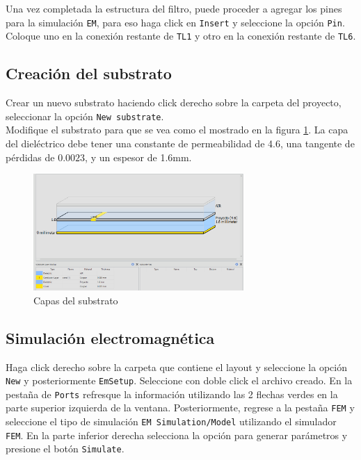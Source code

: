 Una vez completada la estructura del filtro, puede proceder a agregar los pines para la simulación \texttt{EM}, para eso haga click en \texttt{Insert} y seleccione la opción \texttt{Pin}. Coloque uno en la conexión restante de \texttt{TL1} y otro en la conexión restante de \texttt{TL6}.

\subsection{Creación del substrato}

Crear un nuevo substrato haciendo click derecho sobre la carpeta del proyecto, seleccionar la opción \texttt{New substrate}. \\

Modifique el substrato para que se vea como el mostrado en la figura \ref{fig:metologia_substrato}. La capa del dieléctrico debe tener una constante de permeabilidad de 4.6, una tangente de pérdidas de $0.0023$, y un espesor de 1.6mm.
\begin{figure}[!ht]
    \centering
    \includegraphics[width=8cm]{figures/metodologia/metologia4.png}
    \caption{Capas del substrato}
    \label{fig:metologia_substrato}
\end{figure}

\subsection{Simulación electromagnética}

Haga click derecho sobre la carpeta que contiene el layout y seleccione la opción \texttt{New} y posteriormente \texttt{EmSetup}. Seleccione con doble click el archivo creado.
En la pestaña de \texttt{Ports} refresque la información utilizando las 2 flechas verdes en la parte superior izquierda de la ventana. Posteriormente, regrese a la pestaña \texttt{FEM} y seleccione el tipo de simulación \texttt{EM Simulation/Model} utilizando el simulador \texttt{FEM}. En la parte inferior derecha selecciona la opción para generar parámetros y presione el botón \texttt{Simulate}.
